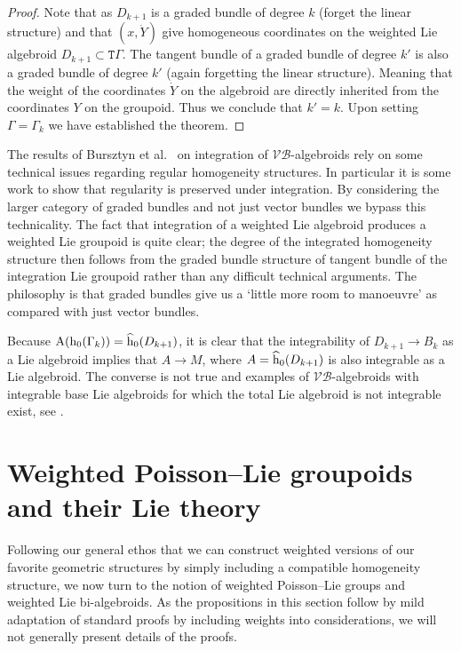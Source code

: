 \documentclass[pdftex]{sigma}
\newcommand{\rmh}{\textnormal{h}}
\def\sT{{\mathtt T}}
\numberwithin{equation}{section}
\begin{document}
\begin{proof}
Note that as $D_{k+1}$ is a graded bundle of degree $k$ (forget the linear structure) and that $(x, \dot{Y})$ give homogeneous coordinates on the weighted Lie algebroid $D_{k+1} \subset \sT \Gamma$. The tangent bundle of a graded bundle of degree $k'$ is also a graded bundle of degree $k'$ (again forgetting the linear structure).  Meaning that the weight of the coordinates $\dot{Y}$ on the algebroid are directly inherited from the coordinates $Y$ on the groupoid.  Thus we conclude that $k' = k$.   Upon setting $\Gamma = \Gamma_{k}$ we have established the theorem.
\end{proof}


\begin{Remark}
The results of  Bursztyn  et al.~\cite{Bursztyn:2014} on integration of $\mathcal{VB}$-algebroids rely on some technical issues regarding regular homogeneity structures. In particular it is some work to show  that regularity is preserved under integration.  By considering the larger category of graded bundles and not just vector bundles we bypass this technicality. The fact that integration of a weighted Lie algebroid produces a weighted Lie groupoid is quite clear; the degree of the integrated homogeneity structure then follows from the graded bundle structure of tangent bundle of the integration Lie groupoid rather than any dif\/f\/icult technical arguments.  The philosophy is that graded bundles give us a `little more room to manoeuvre'  as compared with just vector bundles.
\end{Remark}

Because $\textnormal{A}(\rmh_{0}(\Gamma_{k})) = \widehat{\rmh}_{0}(D_{k+1})$, it is clear that the integrability of $D_{k+1}\rightarrow B_{k}$ as a Lie algebroid implies that $A \rightarrow M$, where $A = \widehat{\rm h}_{0}(D_{k+1})$ is also integrable as a Lie algebroid.  The converse is not true and examples of $\mathcal{VB}$-algebroids with integrable base Lie algebroids for which the total Lie algebroid is not integrable exist, see \cite{Brahic:2014,Bursztyn:2014}.


\section{Weighted Poisson--Lie groupoids and their Lie theory}\label{sec:Weighted Poisson Groupoids}
Following our general ethos that we can construct weighted versions of our favorite geometric structures by simply including a compatible homogeneity structure, we now turn to the notion of weighted Poisson--Lie groups and weighted Lie bi-algebroids.  As the propositions in this section follow by mild adaptation of standard proofs by including weights into considerations, we will not generally present details of the proofs.
\end{document}
